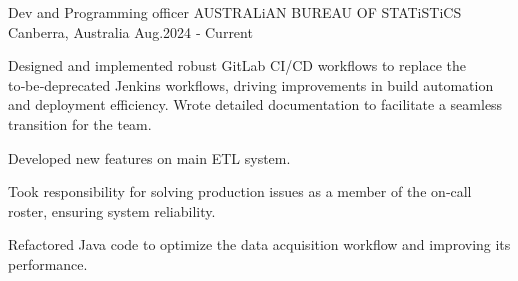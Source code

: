 \begin{cventries}

  \cventry
    {Dev and Programming officer} %
    {AUSTRALiAN BUREAU OF STATiSTiCS} %
    {Canberra, Australia} %
    {Aug.2024 ‑ Current} %
    {
      \begin{cvitems} %
        \item {Designed and implemented robust GitLab CI/CD workflows to replace the to‑be‑deprecated Jenkins workflows, driving improvements in build
        automation and deployment efficiency. Wrote detailed documentation to facilitate a seamless transition for the team.}
        \item {Developed new features on main ETL system.}
        \item {Took responsibility for solving production issues as a member of the on‑call roster, ensuring system reliability.}
        \item {Refactored Java code to optimize the data acquisition workflow and improving its performance.}
      \end{cvitems}
    }


\end{cventries}
